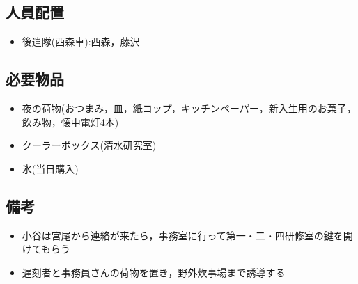 \subsection{人員配置}
\begin{itemize}
\item 後遣隊(西森車):西森，藤沢
\end{itemize}

\newpage

\subsection{必要物品}
\begin{itemize}
  \item 夜の荷物(おつまみ，皿，紙コップ，キッチンペーパー，新入生用のお菓子，飲み物，懐中電灯4本)
    \item クーラーボックス(清水研究室)
    \item 氷(当日購入)
\end{itemize}

\subsection{備考}
\begin{itemize}
\item 小谷は宮尾から連絡が来たら，事務室に行って第一・二・四研修室の鍵を開けてもらう
\item 遅刻者と事務員さんの荷物を置き，野外炊事場まで誘導する
\end{itemize}

%
